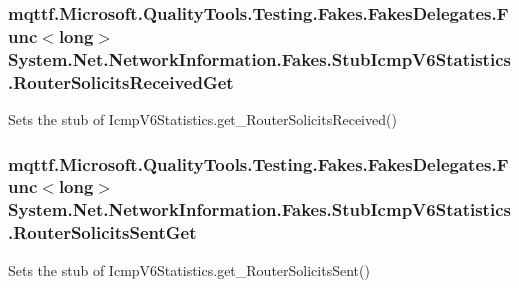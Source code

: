 \hypertarget{class_system_1_1_net_1_1_network_information_1_1_fakes_1_1_stub_icmp_v6_statistics_a11030a8f4b359f84cfde009b739a3920}{
\subsubsection[{Router\-Solicits\-Received\-Get}]{\setlength{\rightskip}{0pt plus 5cm}mqttf.\-Microsoft.\-Quality\-Tools.\-Testing.\-Fakes.\-Fakes\-Delegates.\-Func$<$long$>$ System.\-Net.\-Network\-Information.\-Fakes.\-Stub\-Icmp\-V6\-Statistics.\-Router\-Solicits\-Received\-Get}}\label{class_system_1_1_net_1_1_network_information_1_1_fakes_1_1_stub_icmp_v6_statistics_a11030a8f4b359f84cfde009b739a3920}


Sets the stub of Icmp\-V6\-Statistics.\-get\-\_\-\-Router\-Solicits\-Received()

\hypertarget{class_system_1_1_net_1_1_network_information_1_1_fakes_1_1_stub_icmp_v6_statistics_ac57d6947c3b14b047cb10040b6f33812}{
\subsubsection[{Router\-Solicits\-Sent\-Get}]{\setlength{\rightskip}{0pt plus 5cm}mqttf.\-Microsoft.\-Quality\-Tools.\-Testing.\-Fakes.\-Fakes\-Delegates.\-Func$<$long$>$ System.\-Net.\-Network\-Information.\-Fakes.\-Stub\-Icmp\-V6\-Statistics.\-Router\-Solicits\-Sent\-Get}}\label{class_system_1_1_net_1_1_network_information_1_1_fakes_1_1_stub_icmp_v6_statistics_ac57d6947c3b14b047cb10040b6f33812}


Sets the stub of Icmp\-V6\-Statistics.\-get\-\_\-\-Router\-Solicits\-Sent()

